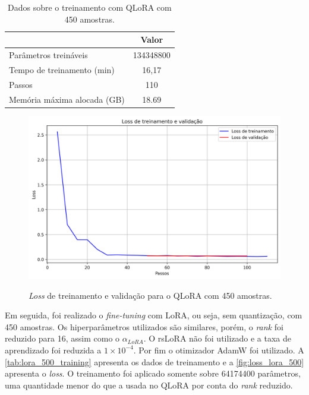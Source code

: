 \begin{table}[ht]
    \caption{\small Dados sobre o treinamento com \ac{QLoRA} com 450 amostras.}
    \centering
    \begin{tabular}{l|c}
        \hline
                                    & Valor     \\ \hline
        Parâmetros treináveis       & 134348800 \\
        Tempo de treinamento (min)  & 16,17     \\
        Passos                      & 110       \\
        Memória máxima alocada (GB) & 18.69     \\ \hline
    \end{tabular}
    \label{tab:qlora_500_training}
\end{table}

\begin{figure}[ht]
    \centering
    \caption{\small \textit{Loss} de treinamento e validação para o \ac{QLoRA} com 450 amostras.}
    \includegraphics[width=0.8\columnwidth,keepaspectratio]{images/loss_qlora_500.png}
    \label{fig:loss_qlora_500}
\end{figure}

Em seguida, foi realizado o \textit{fine-tuning} com \ac{LoRA}, ou seja, sem quantização, com 450 amostras. Os hiperparâmetros utilizados são similares, porém, o
\textit{rank} foi reduzido para 16, assim como o \begin{math}\alpha_{LoRA}\end{math}. O \ac{rsLoRA} não foi utilizado e a taxa de aprendizado foi reduzida a
\begin{math}1 \times 10^{-4}\end{math}. Por fim o otimizador \ac{AdamW} foi utilizado. A \autoref{tab:lora_500_training} apresenta os dados de treinamento e a
\autoref{fig:loss_lora_500} apresenta o \textit{loss}. O treinamento foi aplicado somente sobre 64174400 parâmetros, uma quantidade menor do que a usada no
\ac{QLoRA} por conta do \textit{rank} reduzido.


